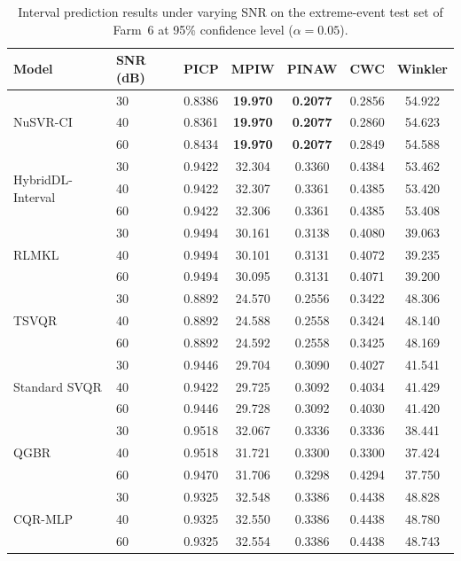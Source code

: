 \begin{table}[ht]
\centering
\caption{Interval prediction results under varying SNR on the extreme-event test set of Farm~6 at 95\% confidence level ($\alpha = 0.05$).}
\setlength{\tabcolsep}{3.0mm}
\begin{tabular}{llccccc}
\toprule
Model & SNR (dB) & PICP & MPIW & PINAW & CWC & Winkler \\
\midrule
\multirow{3}{*}{NuSVR-CI}
  & 30 & 0.8386 & \textbf{19.970} & \textbf{0.2077} & 0.2856 & 54.922 \\
  & 40 & 0.8361 & \textbf{19.970} & \textbf{0.2077} & 0.2860 & 54.623 \\
  & 60 & 0.8434 & \textbf{19.970} & \textbf{0.2077} & 0.2849 & 54.588 \\
\multirow{3}{*}{HybridDL-Interval}
  & 30 & 0.9422 & 32.304 & 0.3360 & 0.4384 & 53.462 \\
  & 40 & 0.9422 & 32.307 & 0.3361 & 0.4385 & 53.420 \\
  & 60 & 0.9422 & 32.306 & 0.3361 & 0.4385 & 53.408 \\
\multirow{3}{*}{RLMKL}
  & 30 & 0.9494 & 30.161 & 0.3138 & 0.4080 & 39.063 \\
  & 40 & 0.9494 & 30.101 & 0.3131 & 0.4072 & 39.235 \\
  & 60 & 0.9494 & 30.095 & 0.3131 & 0.4071 & 39.200 \\
\multirow{3}{*}{TSVQR}
  & 30 & 0.8892 & 24.570 & 0.2556 & 0.3422 & 48.306 \\
  & 40 & 0.8892 & 24.588 & 0.2558 & 0.3424 & 48.140 \\
  & 60 & 0.8892 & 24.592 & 0.2558 & 0.3425 & 48.169 \\
\multirow{3}{*}{Standard SVQR}
  & 30 & 0.9446 & 29.704 & 0.3090 & 0.4027 & 41.541 \\
  & 40 & 0.9422 & 29.725 & 0.3092 & 0.4034 & 41.429 \\
  & 60 & 0.9446 & 29.728 & 0.3092 & 0.4030 & 41.420 \\
\multirow{3}{*}{QGBR}
  & 30 & 0.9518 & 32.067 & 0.3336 & 0.3336 & 38.441 \\
  & 40 & 0.9518 & 31.721 & 0.3300 & 0.3300 & 37.424 \\
  & 60 & 0.9470 & 31.706 & 0.3298 & 0.4294 & 37.750 \\
\multirow{3}{*}{CQR-MLP}
  & 30 & 0.9325 & 32.548 & 0.3386 & 0.4438 & 48.828 \\
  & 40 & 0.9325 & 32.550 & 0.3386 & 0.4438 & 48.780 \\
  & 60 & 0.9325 & 32.554 & 0.3386 & 0.4438 & 48.743 \\

\end{tabular}
\end{table}
